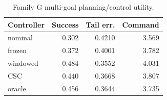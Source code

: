 \begin{table}[t]
\caption{Family G multi-goal planning/control utility.}
\label{tab:planning}
\centering
\begin{tabular}{lrrr}
\toprule
Controller & Success & Tail err. & Command \\
\midrule
nominal & 0.302 & 0.4210 & 3.569 \\
frozen & 0.372 & 0.4001 & 3.782 \\
windowed & 0.484 & 0.3552 & 4.031 \\
CSC & 0.440 & 0.3668 & 3.807 \\
oracle & 0.456 & 0.3644 & 3.735 \\
\bottomrule
\end{tabular}
\end{table}
